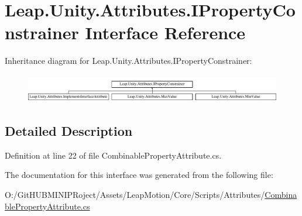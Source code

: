 \hypertarget{interface_leap_1_1_unity_1_1_attributes_1_1_i_property_constrainer}{}\section{Leap.\+Unity.\+Attributes.\+I\+Property\+Constrainer Interface Reference}
\label{interface_leap_1_1_unity_1_1_attributes_1_1_i_property_constrainer}
Inheritance diagram for Leap.\+Unity.\+Attributes.\+I\+Property\+Constrainer\+:\begin{figure}[H]
\begin{center}
\leavevmode
\includegraphics[height=1.248607cm]{interface_leap_1_1_unity_1_1_attributes_1_1_i_property_constrainer}
\end{center}
\end{figure}


\subsection{Detailed Description}


Definition at line 22 of file Combinable\+Property\+Attribute.\+cs.



The documentation for this interface was generated from the following file\+:\begin{DoxyCompactItemize}
\item 
O\+:/\+Git\+H\+U\+B\+M\+I\+N\+I\+P\+Roject/\+Assets/\+Leap\+Motion/\+Core/\+Scripts/\+Attributes/\mbox{\hyperlink{_combinable_property_attribute_8cs}{Combinable\+Property\+Attribute.\+cs}}\end{DoxyCompactItemize}
